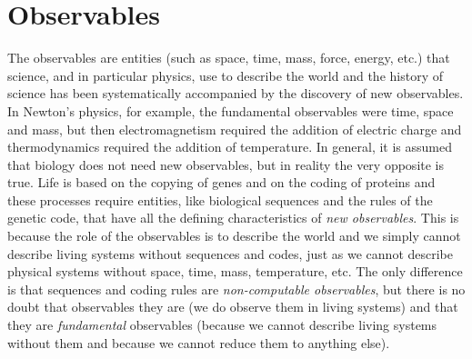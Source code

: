 \documentclass[12pt]{article}
\begin{document}
\section{Observables}
The observables are entities (such as space, time, mass, force, energy, etc.) that science, and in particular physics, use to describe the world and the history of science has been systematically accompanied by the discovery of new observables. In Newton's physics, for example, the fundamental observables were time, space and mass, but then electromagnetism required the addition of electric charge and thermodynamics required the addition of temperature. In general, it is assumed that biology does not need new observables, but in reality the very opposite is true. Life is based on the copying of genes and on the coding of proteins and these processes require entities, like biological sequences and the rules of the genetic code, that have all the defining characteristics of \textit{new observables}. This is because the role of the observables is to describe the world and we simply cannot describe living systems without sequences and codes, just as we cannot describe physical systems without space, time, mass, temperature, etc. The only difference is that sequences and coding rules are \textit{non-computable observables}, but there is no doubt that observables they are (we do observe them in living systems) and that they are \textit{fundamental} observables (because we cannot describe living systems without them and because we cannot reduce them to anything else). 
\end{document}
